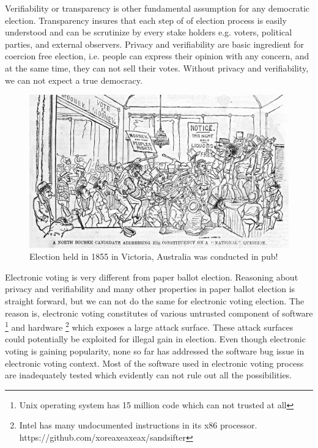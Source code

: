 Verifiability or transparency is other fundamental assumption for 
any democratic election. Transparency insures that each step of 
of election process is easily understood and can be scrutinize by 
every stake holders e.g. voters, political parties, and external 
observers. Privacy and verifiability  are basic 
ingredient for coercion free election, i.e. people 
can express their opinion with any concern, and at the same time,
they can not sell their votes. Without privacy and verifiability, 
we can not expect a true democracy.   

 
 \begin{figure}[htb]
	\begin{center}
	\includegraphics[scale=0.25]{NorthBourke.jpg}
	\caption{Election held in 1855 in Victoria, Australia 
	  was conducted in pub!}
	\end{center}
  \end{figure}   
  
 Electronic voting is very different from paper ballot election. 
 Reasoning 
 about privacy and verifiability and many other properties 
 in paper ballot election 
 is straight forward, but we can not do the same for 
 electronic voting election. The reason is, electronic voting constitutes 
 of various untrusted component of software
 \footnote{Unix operating system has 15 million code which can not 
 trusted at all} and hardware
 \footnote{Intel has many undocumented instructions in its x86 
 processor. https://github.com/xoreaxeaxeax/sandsifter} which 
 exposes a large attack surface. These attack surfaces could 
 potentially be exploited for illegal gain in election. 
 Even though electronic voting is gaining popularity, none so far has 
 addressed the software bug issue in electronic voting context. 
 Most of the software used in electronic voting process are 
 inadequately tested which evidently can not rule out all 
 the possibilities.
  
